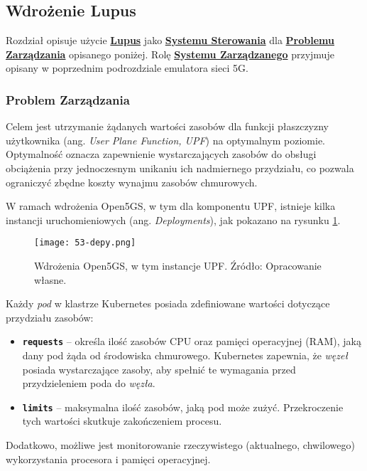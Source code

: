 \subsection{Wdrożenie Lupus}

Rozdział opisuje użycie \hyperlink{def:lupus}{\textbf{Lupus}} jako \hyperlink{def:system-sterowania}{\textbf{Systemu Sterowania}} dla \hyperlink{def:problem-zarzadzania}{\textbf{Problemu Zarządzania}} opisanego poniżej. Rolę \hyperlink{def:system-zarzadzany}{\textbf{Systemu Zarządzanego}} przyjmuje opisany w poprzednim podrozdziale emulatora sieci 5G.

\subsubsection{Problem Zarządzania}

Celem jest utrzymanie żądanych wartości zasobów dla funkcji płaszczyzny użytkownika (ang. \textit{User Plane Function, UPF}) na optymalnym poziomie. Optymalność oznacza zapewnienie wystarczających zasobów do obsługi obciążenia przy jednoczesnym unikaniu ich nadmiernego przydziału, co pozwala ograniczyć zbędne koszty wynajmu zasobów chmurowych.

W ramach wdrożenia Open5GS, w tym dla komponentu UPF, istnieje kilka instancji uruchomieniowych (ang. \textit{Deployments}), jak pokazano na rysunku \ref{fig:53-depy}.

\begin{figure}[!h]
    \centering \texttt{[image: 53-depy.png]}
    \caption{Wdrożenia Open5GS, w tym instancje UPF. Źródło: Opracowanie własne.}\label{fig:53-depy}
\end{figure}

Każdy \textit{pod} w klastrze Kubernetes posiada zdefiniowane wartości dotyczące przydziału zasobów:

\begin{itemize}
    \item \textbf{\texttt{requests}} – określa ilość zasobów CPU oraz pamięci operacyjnej (RAM), jaką dany pod żąda od środowiska chmurowego. Kubernetes zapewnia, że \textit{węzeł} posiada wystarczające zasoby, aby spełnić te wymagania przed przydzieleniem poda do \textit{węzła}.
    \item \textbf{\texttt{limits}} – maksymalna ilość zasobów, jaką pod może zużyć. Przekroczenie tych wartości skutkuje zakończeniem procesu.
\end{itemize}

Dodatkowo, możliwe jest monitorowanie rzeczywistego (aktualnego, chwilowego) wykorzystania procesora i pamięci operacyjnej.


